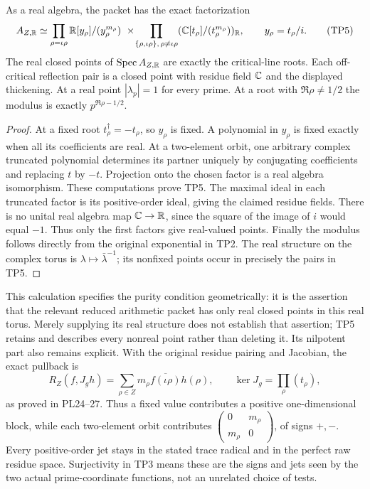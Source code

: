 \begin{proposition}
As a real algebra, the packet has the exact factorization
\[
 A_{Z,\mathbb R}\simeq
 \prod_{\rho=\iota\rho}\mathbb R[y_\rho]/(y_\rho^{m_\rho})
 \ \times\!
 \prod_{\{\rho,\iota\rho\},\,\rho\ne\iota\rho}
       (\mathbb C[t_\rho]/(t_\rho^{m_\rho}))_{\mathbb R},
 \qquad y_\rho=t_\rho/i.
 \tag{TP5}\label{tp:real-factors}
\]
The real closed points of $\operatorname{Spec} A_{Z,\mathbb R}$ are exactly the
critical-line roots. Each off-critical reflection pair is a
closed point with residue field $\mathbb C$ and the displayed thickening.
At a real point $|\lambda_p|=1$ for every prime. At a root with
$\Re\rho\ne1/2$ the modulus is exactly $p^{\Re\rho-1/2}$.
\end{proposition}
\begin{proof}
At a fixed root $t_\rho^\dagger=-t_\rho$, so $y_\rho$ is
fixed. A polynomial in $y_\rho$ is fixed exactly when all its
coefficients are real. At a two-element orbit, one arbitrary
complex truncated polynomial determines its partner uniquely by
conjugating coefficients and replacing $t$ by $-t$. Projection
onto the chosen factor is a real algebra isomorphism. These
computations prove TP5. The maximal ideal in each truncated
factor is its positive-order ideal, giving the claimed residue
fields. There is no unital real algebra map $\mathbb C\to\mathbb R$, since
the square of the image of $i$ would equal $-1$. Thus only the
first factors give real-valued points. Finally the modulus follows
directly from the original exponential in TP2. The real structure
on the complex torus is $\lambda\mapsto\bar\lambda^{-1}$;
its nonfixed points occur in precisely the pairs in TP5.
\end{proof}

This calculation specifies the purity condition geometrically:
it is the assertion that the relevant reduced arithmetic packet
has only real closed points in this real torus. Merely supplying
its real structure does not establish that assertion; TP5 retains
and describes every nonreal point rather than deleting it.
Its nilpotent part also remains explicit. With the original
residue pairing and Jacobian, the exact pullback is
\[
 R_Z(f,J_g h)=
 \sum_{\rho\in Z}m_\rho\overline{f(\iota\rho)}h(\rho),
 \qquad \ker J_g=\prod_\rho(t_\rho),
 \tag{TP6}\label{tp:trace}
\]
as proved in PL24--27. Thus a fixed value contributes a positive
one-dimensional block, while each two-element orbit contributes
$\left(\begin{smallmatrix}0&m_\rho\\m_\rho&0\end{smallmatrix}\right)$,
of signs $+,-$. Every positive-order jet stays in the stated
trace radical and in the perfect raw residue space. Surjectivity
in TP3 means these are the signs and jets seen by the two actual
prime-coordinate functions, not an unrelated choice of tests.

